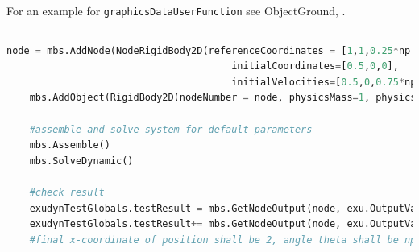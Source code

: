     For an example for \texttt{graphicsDataUserFunction} see ObjectGround, .
    \finishTable
\vspace{6pt}\par\noindent\rule{\textwidth}{0.4pt}
\label{miniExample_ObjectRigidBody2D}
\pythonstyle
\begin{lstlisting}[language=Python, firstnumber=1]
    node = mbs.AddNode(NodeRigidBody2D(referenceCoordinates = [1,1,0.25*np.pi], 
                                       initialCoordinates=[0.5,0,0],
                                       initialVelocities=[0.5,0,0.75*np.pi]))
    mbs.AddObject(RigidBody2D(nodeNumber = node, physicsMass=1, physicsInertia=2))

    #assemble and solve system for default parameters
    mbs.Assemble()
    mbs.SolveDynamic()

    #check result
    exudynTestGlobals.testResult = mbs.GetNodeOutput(node, exu.OutputVariableType.Position)[0]
    exudynTestGlobals.testResult+= mbs.GetNodeOutput(node, exu.OutputVariableType.Coordinates)[2]
    #final x-coordinate of position shall be 2, angle theta shall be np.pi
\end{lstlisting}

